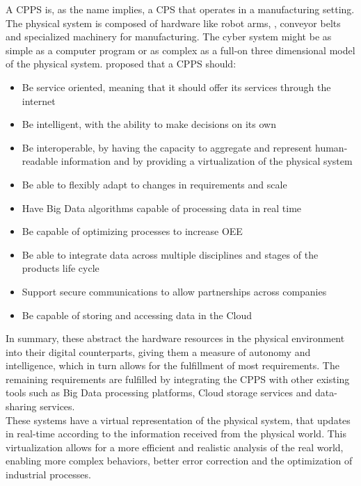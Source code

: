 A \acrlong{CPPS} is, as the name implies, a \acrfull{CPS} that operates in a manufacturing setting. The physical system is composed of hardware like robot arms, , conveyor belts and specialized machinery for manufacturing. The cyber system might be as simple as a computer program or as complex as a full-on three dimensional model of the physical system. \citeauthor{birgit01} \cite{birgit01} proposed that a \acrshort{CPPS} should:
\begin{itemize}
	\item Be service oriented, meaning that it should offer its services through the internet
	\item Be intelligent, with the ability to make decisions on its own
	\item Be interoperable, by having the capacity to aggregate and represent human-readable information and by providing a virtualization of the physical system
	\item Be able to flexibly adapt to changes in requirements and scale
	\item Have Big Data algorithms capable of processing data in real time
	\item Be capable of optimizing processes to increase \acrfull{OEE}
	\item Be able to integrate data across multiple disciplines and stages of the products life cycle
	\item Support secure communications to allow partnerships across companies
	\item Be capable of storing and accessing data in the Cloud
\end{itemize}

In summary, these  abstract the hardware resources in the physical environment into their digital counterparts, giving them a measure of autonomy and intelligence, which in turn allows for the fulfillment of most requirements. The remaining requirements are fulfilled by integrating the \acrshort{CPPS} with other existing tools such as Big Data processing platforms, Cloud storage services and data-sharing services. \\

These systems have a virtual representation of the physical system, that updates in real-time according to the information received from the physical world. This virtualization allows for a more efficient and realistic analysis of the real world, enabling more complex behaviors, better error correction and the optimization of industrial processes.\\

